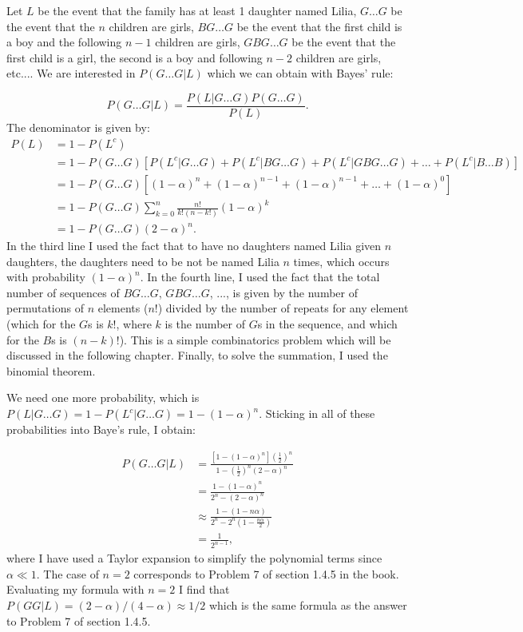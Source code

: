 \begin{problem}{38} Let $L$ be the event that the family has at least 1 daughter named Lilia, $G\ldots G$ be the event that the $n$ children are girls, $BG\ldots G$ be the event that the first child is a boy and the following $n-1$ children are girls, $GBG\ldots G$ be the event that the first child is a girl, the second is a boy and following $n-2$ children are girls, etc....  We are interested in $P(G\ldots G|L)$ which we can obtain with Bayes' rule:

\begin{equation}
P(G\ldots G|L) = \frac{P(L|G\ldots G) P(G\ldots G)}{P(L)}.
\end{equation}
The denominator is given by:
\begin{align*}
P(L) &= 1- P(L^c) \\
&=1-P(G\ldots G)[P(L^c|G\ldots G)+P(L^c|BG\ldots G)+P(L^c|GBG\ldots G)+ \ldots +P(L^c|B \ldots B)] \\
&=1-P(G\ldots G)[(1-\alpha)^n+(1-\alpha)^{n-1}+(1-\alpha)^{n-1}+\ldots + (1-\alpha)^0] \\
&=1-P(G\ldots G)\sum_{k=0}^n \frac{n!}{k!(n-k!)}(1-\alpha)^k \\
&=1-P(G\ldots G)(2-\alpha)^n.
\end{align*}
In the third line I used the fact that to have no daughters named Lilia given $n$ daughters, the daughters need to be not be named Lilia $n$ times, which occurs with probability $(1-\alpha)^n$.  In the fourth line, I used the fact that the total number of sequences of $BG\ldots G$, $GBG\ldots G$, ..., is given by the number of permutations of $n$ elements ($n!$) divided by the number of repeats for any element (which for the $G$s is $k!$, where $k$ is the number of $G$s in the sequence, and which for the $B$s is $(n-k)!$).  This is a simple combinatorics problem which will be discussed in the following chapter.  Finally, to solve the summation, I used the binomial theorem.

We need one more probability, which is $P(L|G\ldots G) = 1 - P(L^c|G\ldots G) = 1 - (1-\alpha)^n$.  Sticking in all of these probabilities into Baye's rule, I obtain:

\begin{align*}
P(G\ldots G|L)& = \frac{[1 - (1-\alpha)^n]\left (\frac{1}{2}\right)^n}{1-\left (\frac{1}{2}\right)^n(2-\alpha)^n} \\
& = \frac{1-(1-\alpha)^n}{2^n-(2-\alpha)^n} \\
& \approx \frac{1-(1-n\alpha)}{2^n-2^n(1-\frac{n\alpha}{2})} \\
& = \frac{1}{2^{n-1}},
\end{align*}
where I have used a Taylor expansion to simplify the polynomial terms since $\alpha \ll 1$. The case of $n=2$ corresponds to Problem 7 of section 1.4.5 in the book.  Evaluating my formula with $n=2$ I find that $P(GG|L) = (2-\alpha)/(4-\alpha)\approx 1/2$ which is the same formula as the answer to Problem 7 of section 1.4.5.

\end{problem}


